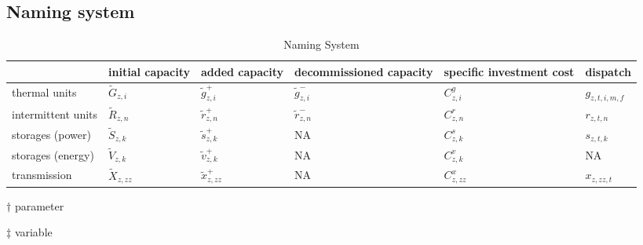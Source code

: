 \documentclass[review, 3p, times]{elsarticle} %
\begin{document}
    \subsection{Naming system}
    \begin{table*}
        \centering
        \begin{threeparttable}
            \caption{Naming System}
            \begin{tabulary}{\textwidth}{LLLLLL}
                \toprule
                & initial capacity\tnote{$\dagger$}    & added capacity\tnote{$\ddagger$}  & decommissioned capacity\tnote{$\ddagger$} & specific investment cost\tnote{$\dagger$} & dispatch\tnote{$\ddagger$}    \\
                \midrule
                thermal units & $\widetilde{G}_{z,i}$                 & $\widetilde{g}^{+}_{z,i}$         & $\widetilde{g}^{-}_{z,i}$                 & $C^{g}_{z,i}$                             & $g_{z,t,i,m,f}$               \\
                intermittent units & $\widetilde{R}_{z,n}$                 & $\widetilde{r}^{+}_{z,n}$         & $\widetilde{r}^{-}_{z,n}$                 & $C^{r}_{z,n}$                             & $r_{z,t,n}$                   \\
                storages (power)    & $\widetilde{S}_{z,k}$                 & $\widetilde{s}^{+}_{z,k}$         & NA & $C^{s}_{z,k}$                             & $s_{z,t,k}$                   \\ %
                storages (energy)   & $\widetilde{V}_{z,k}$                 & $\widetilde{v}^{+}_{z,k}$         & NA & $C^{v}_{z,k}$                             & NA                            \\ %
                transmission & $\widetilde{X}_{z,zz}$                & $\widetilde{x}^{+}_{z,zz}$        & NA & $C^{x}_{z,zz}$                            & $x_{z,zz,t}$                  \\ %
                \bottomrule
            \end{tabulary}

            \begin{tablenotes}
                \item [$\dagger$] parameter
                \item [$\ddagger$] variable
            \end{tablenotes}
        \end{threeparttable}
    \end{table*}
\end{document}
